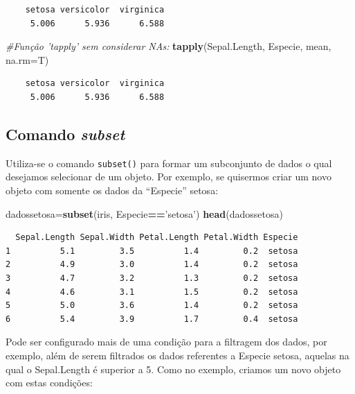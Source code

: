 \documentclass[12pt,brazil,oneside]{book}
\newenvironment{Shaded}{\begin{snugshade}}{\end{snugshade}}
\newcommand{\CommentTok}[1]{\textcolor[rgb]{0.56,0.35,0.01}{\textit{#1}}}
\newcommand{\DataTypeTok}[1]{\textcolor[rgb]{0.13,0.29,0.53}{#1}}
\newcommand{\KeywordTok}[1]{\textcolor[rgb]{0.13,0.29,0.53}{\textbf{#1}}}
\newcommand{\NormalTok}[1]{#1}
\newcommand{\OperatorTok}[1]{\textcolor[rgb]{0.81,0.36,0.00}{\textbf{#1}}}
\newcommand{\StringTok}[1]{\textcolor[rgb]{0.31,0.60,0.02}{#1}}
\begin{document}
\begin{verbatim}
    setosa versicolor  virginica 
     5.006      5.936      6.588 
\end{verbatim}

\begin{Shaded}
\begin{Highlighting}[]
\CommentTok{#Função 'tapply' sem considerar NAs:}
\KeywordTok{tapply}\NormalTok{(Sepal.Length, Especie, mean, }\DataTypeTok{na.rm=}\NormalTok{T)}
\end{Highlighting}
\end{Shaded}

\begin{verbatim}
    setosa versicolor  virginica 
     5.006      5.936      6.588 
\end{verbatim}

\hypertarget{comando-subset}{%
\subsection{\texorpdfstring{Comando
\emph{subset}}{Comando subset}}\label{comando-subset}}

Utiliza-se o comando \texttt{subset()} para formar um subconjunto de
dados o qual desejamos selecionar de um objeto. Por exemplo, se
quisermos criar um novo objeto com somente os dados da ``Especie''
setosa:

\begin{Shaded}
\begin{Highlighting}[]
\NormalTok{dadossetosa=}\KeywordTok{subset}\NormalTok{(iris, Especie}\OperatorTok{==}\StringTok{'setosa'}\NormalTok{)}
\KeywordTok{head}\NormalTok{(dadossetosa)}
\end{Highlighting}
\end{Shaded}

\begin{verbatim}
  Sepal.Length Sepal.Width Petal.Length Petal.Width Especie
1          5.1         3.5          1.4         0.2  setosa
2          4.9         3.0          1.4         0.2  setosa
3          4.7         3.2          1.3         0.2  setosa
4          4.6         3.1          1.5         0.2  setosa
5          5.0         3.6          1.4         0.2  setosa
6          5.4         3.9          1.7         0.4  setosa
\end{verbatim}

Pode ser configurado mais de uma condição para a filtragem dos dados,
por exemplo, além de serem filtrados os dados referentes a Especie
setosa, aquelas na qual o Sepal.Length é superior a 5. Como no exemplo,
criamos um novo objeto com estas condições:
\end{document}
